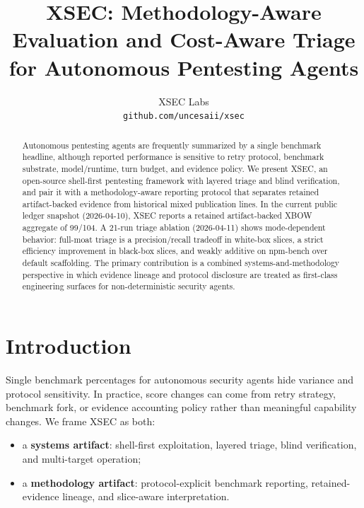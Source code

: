 \documentclass[11pt]{article}
\title{XSEC: Methodology-Aware Evaluation and Cost-Aware Triage for Autonomous Pentesting Agents}
\author{
  XSEC Labs \\
  \texttt{github.com/uncesaii/xsec}
}
\date{}
\begin{document}
\maketitle

\begin{abstract}
Autonomous pentesting agents are frequently summarized by a single benchmark
headline, although reported performance is sensitive to retry protocol,
benchmark substrate, model/runtime, turn budget, and evidence policy. We
present XSEC, an open-source shell-first pentesting framework with layered
triage and blind verification, and pair it with a methodology-aware reporting
protocol that separates retained artifact-backed evidence from historical mixed
publication lines. In the current public ledger snapshot (2026-04-10), XSEC
reports a retained artifact-backed XBOW aggregate of 99/104. A 21-run triage
ablation (2026-04-11) shows mode-dependent behavior: full-moat triage is a
precision/recall tradeoff in white-box slices, a strict efficiency improvement
in black-box slices, and weakly additive on npm-bench over default scaffolding.
The primary contribution is a combined systems-and-methodology perspective in
which evidence lineage and protocol disclosure are treated as first-class
engineering surfaces for non-deterministic security agents.
\end{abstract}

\section{Introduction}

Single benchmark percentages for autonomous security agents hide variance and
protocol sensitivity. In practice, score changes can come from retry strategy,
benchmark fork, or evidence accounting policy rather than meaningful capability
changes. We frame XSEC as both:

\begin{itemize}[leftmargin=*]
  \item a \textbf{systems artifact}: shell-first exploitation, layered triage,
  blind verification, and multi-target operation;
  \item a \textbf{methodology artifact}: protocol-explicit benchmark reporting,
  retained-evidence lineage, and slice-aware interpretation.
\end{itemize}
\end{document}
